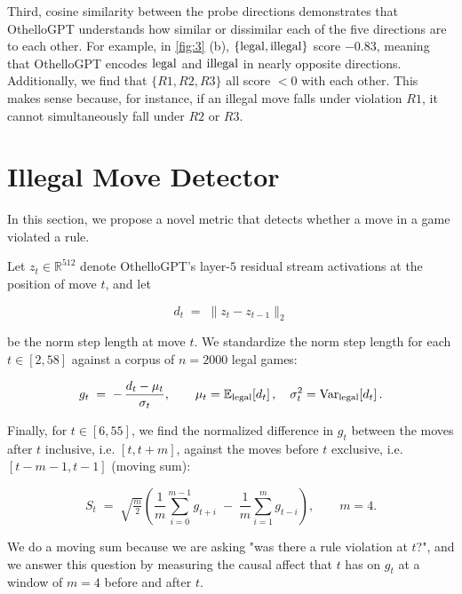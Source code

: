 \documentclass{article}
\begin{document}
Third, cosine similarity between the probe directions demonstrates that OthelloGPT understands how similar or dissimilar each of the five directions are to each other. For example, in \cref{fig:3} (b), $\{\rm legal, \rm illegal \}$ score $-0.83$, meaning that OthelloGPT encodes $\rm legal$ and $\rm illegal$ in nearly opposite directions. Additionally, we find that $\{R1, R2, R3\}$ all score $< 0$ with each other. This makes sense because, for instance, if an illegal move falls under violation $R1$, it cannot simultaneously fall under $R2$ or $R3$. 

\section{Illegal Move Detector}

In this section, we propose a novel metric that detects whether a move in a game violated a rule. 

Let $z_t \in \mathbb{R}^{512}$ denote OthelloGPT's layer-$5$ residual stream activations at the position of move $t$, and let

\begin{equation}
    d_t \;=\; \lVert z_t - z_{t-1} \rVert_2
    \label{eq:step}
\end{equation}

be the norm step length at move $t$. We standardize the norm step length for each $t \in [2, 58]$ against a corpus of $n = 2000$ legal games:

\begin{equation}
  g_t \;=\; -\,\frac{d_t - \mu_t}{\sigma_t},
  \qquad
  \mu_t = \mathbb{E}_{\rm legal}\!\left[d_t\right],
  \quad
  \sigma_t^2 = \mathrm{Var}_{\rm legal}\!\left[d_t\right]. 
  \label{eq:drop}
\end{equation} 
  
Finally, for $t \in [6, 55]$, we find the normalized difference in $g_t$ between the moves after $t$ inclusive, i.e. $[t, t+m]$, against the moves before $t$ exclusive, i.e. $[t-m-1, t-1]$ (moving sum):

  \begin{equation}
      S_t \;=\; \sqrt{\tfrac{m}{2}}\left(
          \frac{1}{m}\sum_{i=0}^{m-1} g_{t+i}
          \;-\;
          \frac{1}{m}\sum_{i=1}^{m} g_{t-i}
      \right), 
      \qquad m = 4 .
      \label{eq:mosum}
  \end{equation}

We do a moving sum because we are asking "was there a rule violation at $t$?", and we answer this question by measuring the causal affect that $t$ has on $g_t$ at a window of $m = 4$ before and after $t$.
\end{document}
